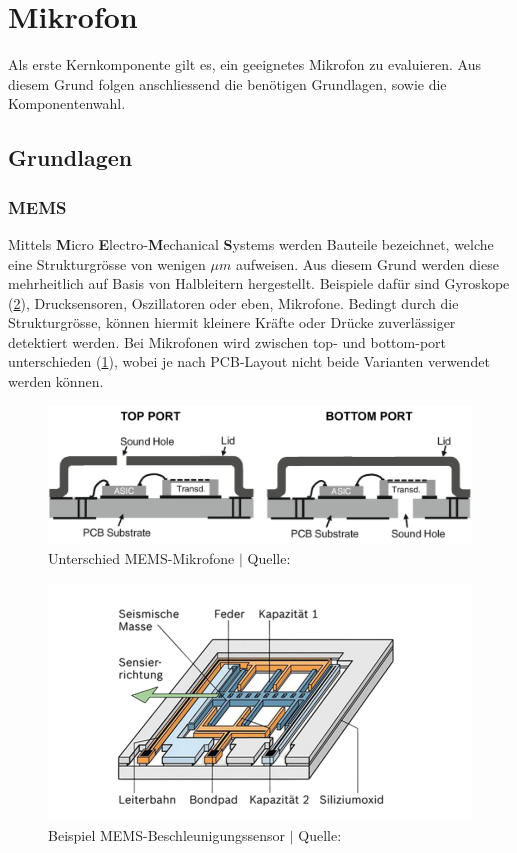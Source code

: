 \documentclass[12pt]{article}
\begin{document}
	\newpage
	\section{Mikrofon}\label{Mikrofon}
	Als erste Kernkomponente gilt es, ein geeignetes Mikrofon zu evaluieren. Aus diesem Grund folgen anschliessend die benötigen Grundlagen, sowie die Komponentenwahl.
	\subsection{Grundlagen}
	\subsubsection*{MEMS}
	Mittels \textbf{M}icro \textbf{E}lectro-\textbf{M}echanical \textbf{S}ystems werden Bauteile bezeichnet, welche eine Strukturgrösse von wenigen $\mu m$ aufweisen. Aus diesem Grund werden diese mehrheitlich auf Basis von Halbleitern hergestellt. Beispiele dafür sind Gyroskope (\ref{fig:batbeispielbeschleunigungssensor}), Drucksensoren, Oszillatoren oder eben, Mikrofone. Bedingt durch die Strukturgrösse, können hiermit kleinere Kräfte oder Drücke zuverlässiger detektiert werden. Bei Mikrofonen wird zwischen top- und bottom-port unterschieden (\ref{fig:batmems-mikrofon}), wobei je nach PCB-Layout nicht beide Varianten verwendet werden können. 
	\begin{figure}[H]
		\centering
		\includegraphics[width=0.6\linewidth]{images/BAT_MEMS-Mikrofon}
		\caption{Unterschied MEMS-Mikrofone $\vert$ Quelle: \cite{feiertag_flip_2010}}
		\label{fig:batmems-mikrofon}
	\end{figure}
	\begin{figure}[H]
		\centering
		\includegraphics[width=0.6\linewidth]{images/BAT_Beispiel_Beschleunigungssensor_transparent}
		\caption{Beispiel MEMS-Beschleunigungssensor $\vert$ Quelle: \cite{noauthor_peripherer_nodate}}
		\label{fig:batbeispielbeschleunigungssensor}
	\end{figure}
	
\end{document}
